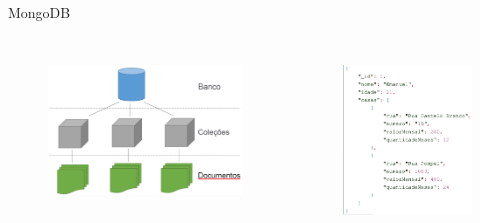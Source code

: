 \documentclass{beamer} %
\begin{document}
\begin{frame}{MongoDB}
\vspace*{-1.6cm}
\begin{columns}

    \begin{figure}
        \centering
        \includegraphics[width=\linewidth]{imagens/mongodb-camadas.png}
        \label{fig:mongodb-camadas}
    \end{figure}
    
    
    \begin{figure}
        \centering
        \includegraphics[height=\textheight]{imagens/BJSON_cut.png}
        \label{fig:bjson}
    \end{figure}
\end{columns}
\end{frame}
\end{document}
